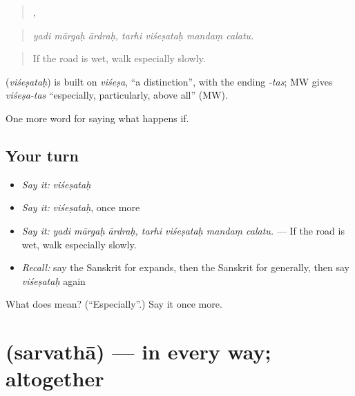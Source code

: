 \begin{quote}
  ,    
\end{quote}

\begin{quote}
\emph{yadi mārgaḥ ārdraḥ, tarhi viśeṣataḥ mandaṃ calatu.}
\end{quote}

\begin{quote}
If the road is wet, walk especially slowly.
\end{quote}

\begin{cousinweb}
\textbf{} (\emph{viśeṣataḥ}) is built on \emph{viśeṣa}, \textquotedblleft{}a distinction\textquotedblright{}, with the ending \emph{-tas}; MW gives \emph{viśeṣa-tas} \textquotedblleft{}especially, particularly, above all\textquotedblright{} (MW).
\end{cousinweb}

\begin{grammarlens}[title={What you've built}]
One more word for saying what happens if.
\end{grammarlens}

\subsection*{Your turn}
\begin{itemize}
\raggedright
  \item \emph{Say it:} \emph{viśeṣataḥ}
  \item \emph{Say it:} \emph{viśeṣataḥ}, once more
  \item \emph{Say it:} \emph{yadi mārgaḥ ārdraḥ, tarhi viśeṣataḥ mandaṃ calatu.} — If the road is wet, walk especially slowly.
  \item \emph{Recall:} say the Sanskrit for expands, then the Sanskrit for generally, then say \emph{viśeṣataḥ} again
\end{itemize}

\begin{tcolorbox}[breakable,colback=teal!4,colframe=teal!35!black,title={Before you move on}]
What does  mean? (\textquotedblleft{}Especially\textquotedblright{}.) Say it once more.
\end{tcolorbox}
\section[\texorpdfstring{\sk{सर्वथा} (sarvathā)}{सर्वथा (sarvathā)}]{ (sarvathā) — in every way; altogether}

